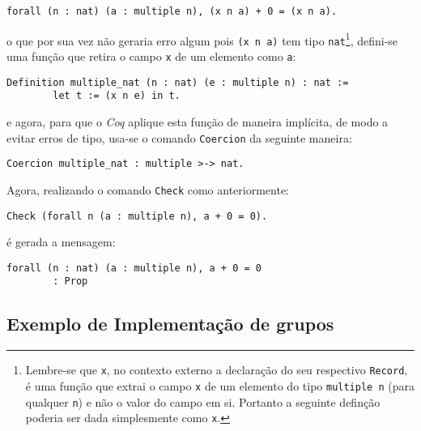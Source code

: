 \begin{lstlisting}[language = coq]
    forall (n : nat) (a : multiple n), (x n a) + 0 = (x n a).
\end{lstlisting}
o que por sua vez não geraria erro algum pois \lstinline[language = coq]$(x n a)$ tem tipo \lstinline[language = coq]$nat$\footnote{Lembre-se que \lstinline[language = coq]$x$, no contexto externo a declaração do seu respectivo \lstinline[language = coq]$Record$, é uma função que extrai o campo \lstinline[language = coq]$x$ de um elemento do tipo \lstinline[language = coq]$multiple n$ (para qualquer \lstinline[language = coq]$n$) e não o valor do campo em si. Portanto a seguinte definção poderia ser dada simplesmente como \lstinline[language = coq]$x$.}, defini-se uma função que retira o campo \lstinline[language = coq]$x$ de um elemento como \lstinline[language = coq]$a$:
\begin{lstlisting}[language = coq]
    Definition multiple_nat (n : nat) (e : multiple n) : nat :=
        let t := (x n e) in t.
\end{lstlisting}
e agora, para que o \textit{Coq} aplique esta função de maneira implícita, de modo a evitar erros de tipo, usa-se o comando \lstinline[language = coq]$Coercion$ da seguinte maneira:
\begin{lstlisting}[language = coq]
    Coercion multiple_nat : multiple >-> nat.
\end{lstlisting}
Agora, realizando o comando \lstinline[language = coq]$Check$ como anteriormente:
\begin{lstlisting}[language = coq]
    Check (forall n (a : multiple n), a + 0 = 0).
\end{lstlisting}
é gerada a mensagem:
\begin{lstlisting}[language = coq-error]
    forall (n : nat) (a : multiple n), a + 0 = 0
        : Prop
\end{lstlisting}

\subsection{Exemplo de Implementação de grupos}
\label{sub:grupos}

